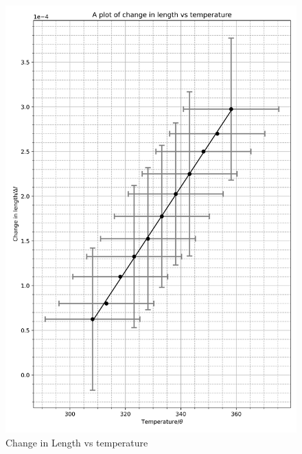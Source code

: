 \documentclass[12pt, a4paper]{article}
\begin{document}
\begin{figure}
    \centering
    \includegraphics[width = \textwidth]{Plot1.png}
    \caption{Change in Length vs temperature}
    \label{fig: plot1}
\end{figure}
\end{document}
